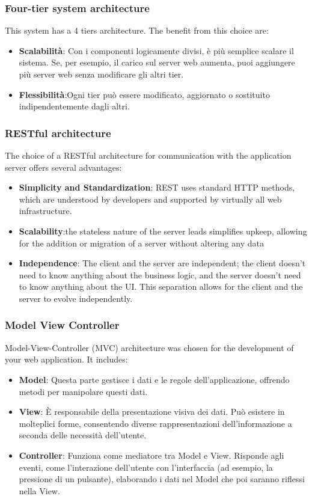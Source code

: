 \subsubsection{Four-tier system architecture}
This system has a 4 tiers architecture. The benefit from this choice are:
\begin{itemize}
    \item \textbf{Scalabilità}: Con i componenti logicamente divisi, è più semplice scalare il sistema. Se, per esempio, il carico sul server web aumenta, puoi aggiungere più server web senza modificare gli altri tier.
    \item \textbf{Flessibilità}:Ogni tier può essere modificato, aggiornato o sostituito indipendentemente dagli altri.
\end{itemize}
\subsubsection{RESTful architecture
}
The choice of a RESTful architecture for communication with the application server offers several advantages:
\begin{itemize}
    \item \textbf{Simplicity and Standardization}: REST uses standard HTTP methods, which are understood by developers and supported by virtually all web infrastructure. 
    \item \textbf{Scalability}:the stateless nature of the server leads simplifies upkeep, allowing for the addition or migration of a server without altering any data
    \item \textbf{Independence}: The client and the server are independent; the client doesn't need to know anything about the business logic, and the server doesn't need to know anything about the UI. This separation allows for the client and the server to evolve independently.
\end{itemize}
\subsubsection{Model View Controller}
Model-View-Controller (MVC) architecture was chosen for the development of your web application. It includes:
\begin{itemize}
    \item \textbf{Model}: Questa parte gestisce i dati e le regole dell'applicazione, offrendo metodi per manipolare questi dati.
    \item \textbf{View}: È responsabile della presentazione visiva dei dati. Può esistere in molteplici forme, consentendo diverse rappresentazioni dell'informazione a seconda delle necessità dell'utente.
    \item \textbf{Controller}: Funziona come mediatore tra Model e View. Risponde agli eventi, come l'interazione dell'utente con l'interfaccia (ad esempio, la pressione di un pulsante), elaborando i dati nel Model che poi saranno riflessi nella View.
\end{itemize}

